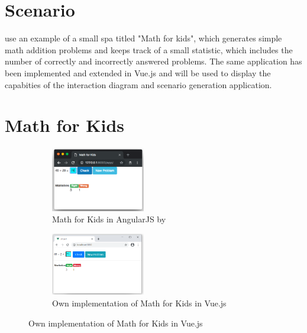 \section{Scenario}
\textcite{zhang2019scenario} use an example of a small \gls{spa} titled "Math for kids", which generates simple math addition problems and keeps track of a small statistic, which includes the number of correctly and incorrectly answered problems. The same application has been implemented and extended in Vue.js and will be used to display the capabities of the interaction diagram and scenario generation application.

\section{Math for Kids}

\begin{figure}[H]
    \centering
    \begin{subfigure}[b]{0.45\textwidth}
         \centering
         \includegraphics[width=0.45\textwidth]{images/math_for_kids_zhang.png}
         \caption{Math for Kids in AngularJS by \textcite{zhang2019scenario}}
         \label{fig:evaluation_math_kids_zhang}
    \end{subfigure}\hfill%
    \begin{subfigure}[b]{0.45\textwidth}
        \centering
        \includegraphics[width=0.45\textwidth]{images/math_for_kids_own.png}
        \caption{Own implementation of Math for Kids in Vue.js}
        \label{fig:evaluation_math_kids_own}
    \end{subfigure}\hfill%
\end{figure}


